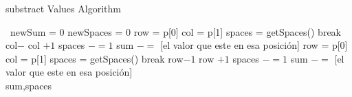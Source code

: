 \documentclass[conference]{IEEEtran}
\begin{document}
  \begin{algorithm}
   \caption{substract Values Algorithm}
    \begin{algorithmic}[1]
      \
        \State newSum = 0
        \State newSpaces = 0
        		\State row = p[0]
        		\State col = p[1]
        				\State spaces = getSpaces()
        				\State break
        			\EndIf
        			\State col$-$
        		\EndWhile
        		\State col $+ 1$
        	\EndIf
        		\State spaces $-= 1$
        		\State sum $-= $ [el valor que este en esa posici\'on]
        	\EndIf
        	\EndFor
        		\State row = p[0]
        		\State col = p[1]
        				\State spaces = getSpaces()
        				\State break
        			\EndIf
        			\State row$- 1$
        		\EndWhile
        		\State row $+ 1$
        	\EndIf
        		\State spaces $-= 1$
        		\State sum $-= $ [el valor que este en esa posici\'on]
        	\EndIf
        	\EndFor \\
		\Return sum,spaces
       \EndFunction
\end{algorithmic}
\end{algorithm}
\end{document}
